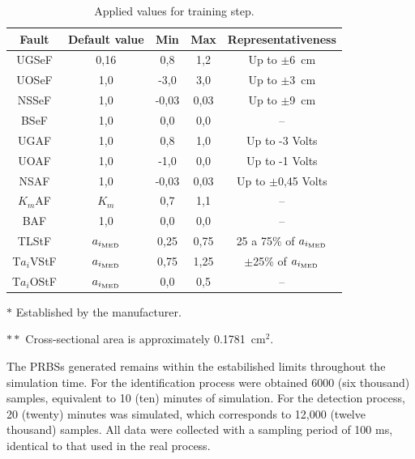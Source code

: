 \documentclass[10pt,fleqn,a4paper]{article}
\begin{document}
\begin{table}[htb]
\caption{Applied values for training step.}
\label{tab:values}
\centering
\begin{threeparttable}
\begin{tabular}{|c|c|c|c|c|}
\hline
{\bf Fault} & {\bf Default value} & {\bf Min} & {\bf Max} & 
{\bf Representativeness}\\
\hline
UGSeF & 0,16\tnote{$*$} & 
0,8 & 1,2 & Up to $\pm$6\ cm\\
\hline
UOSeF & 1,0 & -3,0 & 3,0 & Up to $\pm$3\ cm\\
\hline
NSSeF & 1,0 & -0,03 & 0,03 & Up to $\pm$9\ cm\\
\hline
BSeF & 1,0 & 0,0 & 0,0 & -- \\
\hline
UGAF & 1,0 & 0,8 & 1,0 & Up to -3 Volts\\
\hline
UOAF & 1,0 & -1,0 & 0,0 & Up to -1 Volts\\
\hline
NSAF & 1,0 & -0,03 & 0,03 & Up to $\pm$0,45 Volts\\
\hline
$K_m$AF & $K_m$ & 0,7 & 1,1 & --\\
\hline
BAF & 1,0 & 0,0 & 0,0 & --\\
\hline
TLStF & $a_{i_{\text{\tiny MED}}}$\tnote{$**$} & 
0,25 & 0,75 & 25 a 75\% of $a_{i_{\text{\tiny MED}}}$\\
\hline
T$a_i$VStF & $a_{i_{\text{\tiny MED}}}$ & 
0,75 & 1,25 & $\pm$25\% of $a_{i_{\text{\tiny MED}}}$\\
\hline
T$a_i$OStF & $a_{i_{\text{\tiny MED}}}$ & 
0,0 & 0,5 & --\\
\hline
\end{tabular}
\begin{tablenotes}
\item [$*$] Established by the manufacturer.
\item [$**$] Cross-sectional area is approximately 0.1781\ cm${}^2$.
\end{tablenotes}
\end{threeparttable}
\end{table}

The PRBSs generated remains within the estabilished limits throughout the
simulation time. For the identification process were obtained 6000 (six
thousand) samples, equivalent to 10 (ten) minutes of simulation. For the
detection process, 20 (twenty) minutes was simulated, which corresponds to
12,000 (twelve thousand) samples. All data were collected with a sampling period
of 100 ms, identical to that used in the real process.
\end{document}
